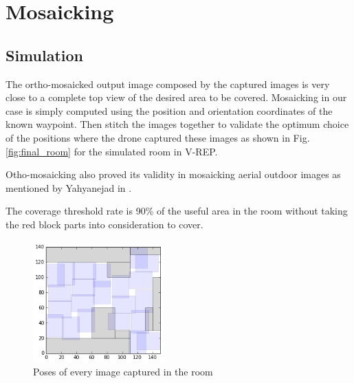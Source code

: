 \section{Mosaicking}

\subsection{Simulation}

The ortho-mosaicked output image composed by the captured
images is very close to a complete top view of the desired area to be covered. Mosaicking in our case is simply computed using the position and orientation coordinates of the known waypoint. Then stitch the images together to validate the optimum choice of the positions where the drone captured these images as shown in Fig.\ref{fig:final_room} for the simulated room in V-REP.

Otho-mosaicking also proved its validity in mosaicking aerial outdoor images as mentioned by Yahyanejad in  \cite{yahyanejad2010incremental}.

The coverage threshold rate is 90\% of the useful area in the room without taking the red block parts into consideration to cover.

\begin{figure}[H]
 \includegraphics[width=0.45\textwidth,angle=90]{figures/room_python.PNG}
  \caption{Poses of every image captured in the room}
\end{figure}


